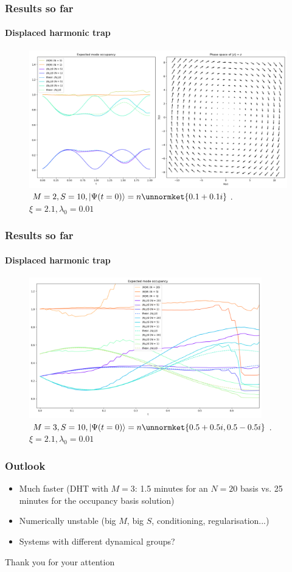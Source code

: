 \documentclass[english]{beamer}
\begin{document}
  \begin{frame}
  	\frametitle{Results so far}
  	\framesubtitle{Displaced harmonic trap}
  	\begin{figure}
	\centering
    		\includegraphics[width=1\textwidth]{images/DHT_M=2_PS}
    		\caption{$M=2, S=10, \ket{\Psi(t=0)}=n\unnormket{0.1+0.1i}$. $\xi=2.1, \lambda_0=0.01$}
    		\label{fig:DHT2}
	\end{figure}
  \end{frame}
  
  \begin{frame}
  	\frametitle{Results so far}
  	\framesubtitle{Displaced harmonic trap}
  	\begin{figure}
	\centering
    		\includegraphics[width=0.9\textwidth]{images/DHT_M=3}
    		\caption{$M=3, S=10, \ket{\Psi(t=0)}=n\unnormket{0.5+0.5i,0.5-0.5i}$. $\xi=2.1, \lambda_0=0.01$}
    		\label{fig:DHT3}
	\end{figure}
  \end{frame}
  
  \begin{frame}
  	\frametitle{Outlook}
  	\begin{itemize}
  		\item Much faster (DHT with $M=3$: 1.5 minutes for an $N=20$ basis vs. 25 minutes for the occupancy basis solution)
  		\item Numerically unstable (big $M$, big $S$, conditioning, regularisation...)
  		\item Systems with different dynamical groups?
  	\end{itemize}
  \end{frame}
  
  \begin{frame}[plain,c]
  	\begin{center}
  	  \Huge Thank you for your attention
  	\end{center}
  \end{frame}
\end{document}
